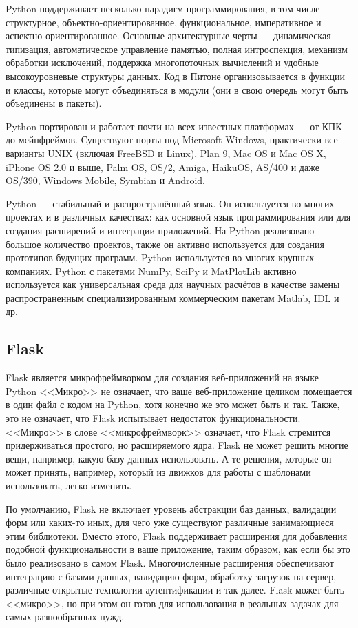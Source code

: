 Python поддерживает несколько парадигм программирования, в том числе структурное, объектно-ориентированное, функциональное, императивное и аспектно-ориентированное. 
Основные архитектурные черты --- динамическая типизация, автоматическое управление памятью, полная интроспекция, механизм обработки исключений, поддержка многопоточных вычислений и удобные высокоуровневые структуры данных. 
Код в Питоне организовывается в функции и классы, которые могут объединяться в модули (они в свою очередь могут быть объединены в пакеты).

Python портирован и работает почти на всех известных платформах --- от КПК до мейнфреймов. 
Существуют порты под Microsoft Windows, практически все варианты UNIX (включая FreeBSD и Linux), Plan 9, Mac OS и Mac OS X, iPhone OS 2.0 и выше, Palm OS, OS/2, Amiga, HaikuOS, AS/400 и даже OS/390, Windows Mobile, Symbian и Android.

Python --- стабильный и распространённый язык. 
Он используется во многих проектах и в различных качествах: как основной язык программирования или для создания расширений и интеграции приложений. 
На Python реализовано большое количество проектов, также он активно используется для создания прототипов будущих программ. 
Python используется во многих крупных компаниях.
Python с пакетами NumPy, SciPy и MatPlotLib активно используется как универсальная среда для научных расчётов в качестве замены распространенным специализированным коммерческим пакетам Matlab, IDL и др.\cite{python-main}

\subsection{Flask}
Flask является микрофреймворком для создания веб-приложений на языке Python
<<Микро>> не означает, что ваше веб-приложение целиком помещается в один файл с кодом на Python, хотя конечно же это может быть и так. 
Также, это не означает, что Flask испытывает недостаток функциональности. 
<<Микро>> в слове <<микрофреймворк>> означает, что Flask стремится придерживаться простого, но расширяемого ядра. 
Flask не может решить многие вещи, например, какую базу данных использовать. 
А те решения, которые он может принять, например, который из движков для работы с шаблонами использовать, легко изменить. 

По умолчанию, Flask не включает уровень абстракции баз данных, валидации форм или каких-то иных, для чего уже существуют различные занимающиеся этим библиотеки. 
Вместо этого, Flask поддерживает расширения для добавления подобной функциональности в ваше приложение, таким образом, как если бы это было реализовано в самом Flask. 
Многочисленные расширения обеспечивают интеграцию с базами данных, валидацию форм, обработку загрузок на сервер, различные открытые технологии аутентификации и так далее. 
Flask может быть <<микро>>, но при этом он готов для использования в реальных задачах для самых разнообразных нужд.


